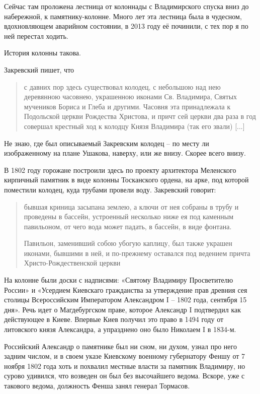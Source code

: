 Сейчас там проложена лестница от колоннады с Владимирского спуска вниз до набережной, к памятнику-колонне. Много лет эта лестница была в чудесном, вдохновляющем аварийном состоянии, в 2013 году её починили, с тех пор я по ней перестал ходить.

История колонны такова.

Закревский пишет, что

\begin{quotation}
с давних пор здесь существовал колодец, с небольшою над нею деревянною часовнею, украшенною иконами Св. Владимира, Святых мучеников Бориса и Глеба и другими. Часовня эта принадлежала к Подольской церкви Рождества Христова, и причт сей церкви два раза в год совершал крестный ход к колодцу Князя Владимира (так его звали) [...]
\end{quotation}

Не знаю, где был описываемый Закревским колодец – по месту ли изображенному на плане Ушакова, наверху, или же внизу. Скорее всего внизу.

В 1802 году горожане построили здесь по проекту архитектора Меленского кирпичный памятник в виде колонны Тосканского ордена, на арке, под которой поместили колодец, куда трубами провели воду. Закревский говорит:

\begin{quotation}
бывшая криница засыпана землею, а ключи от нея собраны в трубу и проведены в бассейн, устроенный несколько ниже ея под каменным павильоном, от чего вода может падать, в бассейн, в виде фонтана.

Павильон, заменивший собою убогую каплицу, был также украшен иконами, бывшими в ней, и по-прежнему оставался под ведением причта Христо-Рождественской церкви
\end{quotation}

На колонне были доски с надписями: «Святому Владимиру Просветителю России» и «Усердием Киевскаго гражданства за утверждение прав древния сея столицы Всероссийским Императором Александром I – 1802 года, сентября 15 дня». Речь идет о Магдебургском праве, которое Александр I подтвердил как действующее в Киеве. Впервые Киев получил это право в 1494 году от литовского князя Александра, а упразднено оно было Николаем I в 1834-м.

Российский Александр о памятнике был ни сном, ни духом, узнал про него задним числом, и в своем указе Киевскому военному губернатору Феншу от 7 ноября 1802 года хоть и похвалил местные власти за памятник Владимиру, но сурово удивился, что возведен он был без высочайшего ведома. Вскоре, уже с такового ведома, должность Фенша занял генерал Тормасов.

